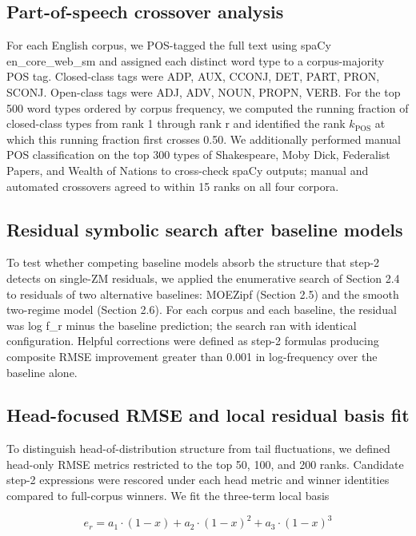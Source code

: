 \documentclass[11pt]{article}
\begin{document}
\subsection{Part-of-speech crossover analysis}

For each English corpus, we POS-tagged the full text using spaCy en\_core\_web\_sm and assigned each distinct word type to a corpus-majority POS tag. Closed-class tags were ADP, AUX, CCONJ, DET, PART, PRON, SCONJ. Open-class tags were ADJ, ADV, NOUN, PROPN, VERB. For the top 500 word types ordered by corpus frequency, we computed the running fraction of closed-class types from rank 1 through rank r and identified the rank $k_{\mathrm{POS}}$ at which this running fraction first crosses 0.50. We additionally performed manual POS classification on the top 300 types of Shakespeare, Moby Dick, Federalist Papers, and Wealth of Nations to cross-check spaCy outputs; manual and automated crossovers agreed to within 15 ranks on all four corpora.

\subsection{Residual symbolic search after baseline models}

To test whether competing baseline models absorb the structure that step-2 detects on single-ZM residuals, we applied the enumerative search of Section 2.4 to residuals of two alternative baselines: MOEZipf (Section 2.5) and the smooth two-regime model (Section 2.6). For each corpus and each baseline, the residual was log f\_r minus the baseline prediction; the search ran with identical configuration. Helpful corrections were defined as step-2 formulas producing composite RMSE improvement greater than 0.001 in log-frequency over the baseline alone.

\subsection{Head-focused RMSE and local residual basis fit}

To distinguish head-of-distribution structure from tail fluctuations, we defined head-only RMSE metrics restricted to the top 50, 100, and 200 ranks. Candidate step-2 expressions were rescored under each head metric and winner identities compared to full-corpus winners. We fit the three-term local basis

\begin{equation}
\tag{11}\label{eq:head-basis}
e_r = a_1 \cdot (1 - x) + a_2 \cdot (1 - x)^2 + a_3 \cdot (1 - x)^3
\end{equation}
\end{document}
